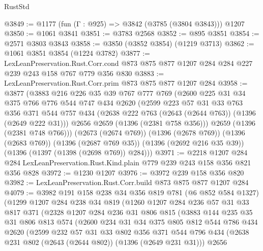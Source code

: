 \begin{lexlean}{RustStd}
\begin{coremodule}
@3849 := @1177 (fun (Γ : @925) => @3842 (@3785 (@3804 @3843))) @1207
@3850 := @1061 @3841
@3851 := @3783 @2568
@3852 := @895 @3851
@3854 := @2571 @3803 @3843
@3858 := @3850 (@3852 @3854) (@1219 @3713)
@3862 := @1061 @3851 @3854 (@1224 @3782)
@3877 := LexLeanPreservation.Rust.Corr.cond
    @873
    @875
    @877
    @1207
    @284
    @284
    @227
    @239
    @243
    @158
    @767
    @779
    @356
    @830
@3883 := LexLeanPreservation.Rust.Corr.prim @873 @875 @877 @1207 @284
@3958 := @3877
    (@3883
      @216
      @226
      @35
      @39
      @767
      @777
      @769
      (@2600
        @225
        @31
        @34
        @375
        @766
        @776
        @544
        @747
        @434
        @2620
        (@2599
          @223
          @57
          @31
          @33
          @763
          @356
          @371
          @544
          @757
          @434
          (@2638 @222 @763 (@2643 (@2644 @763)) (@1396 (@2649 @222 @31)))
          @2656
          @2659
          (@1396 (@2381 @758 @356)))
        @2659
        (@1396 (@2381 @748 @766)))
      (@2673 (@2674 @769))
      (@1396 (@2678 @769))
      (@1396 (@2683 @769))
      (@1396 (@2687 @769 @35))
      (@1396 (@2692 @216 @35 @39))
      (@1396 (@1397 (@1398 (@2698 @769)) @284)))
@3971 := @2218
    @1207
    @284
    @284
    LexLeanPreservation.Rust.Kind.plain
    @779
    @239
    @243
    @158
    @356
    @821
    @356
    @828
@3972 := @1230 @1207
@3976 := @3972 @239 @158 @356 @820
@3982 := LexLeanPreservation.Rust.Corr.build @873 @875 @877 @1207 @284
@4079 := @3982
    @191
    @158
    @238
    @34
    @356
    @819
    @781
    (@6 @852 @584 @1327)
    (@1299
      @1207
      @284
      @238
      @34
      @819
      (@1260
        @1207
        @284
        @236
        @57
        @31
        @33
        @817
        @371
        (@2328
          @1207
          @284
          @236
          @31
          @806
          @815
          (@3883
            @144
            @235
            @35
            @31
            @806
            @813
            @574
            (@2600
              @234
              @31
              @34
              @375
              @805
              @812
              @544
              @786
              @434
              @2620
              (@2599
                @232
                @57
                @31
                @33
                @802
                @356
                @371
                @544
                @796
                @434
                (@2638 @231 @802 (@2643 (@2644 @802)) (@1396 (@2649 @231 @31)))
                @2656

\end{coremodule}
\end{lexlean}
